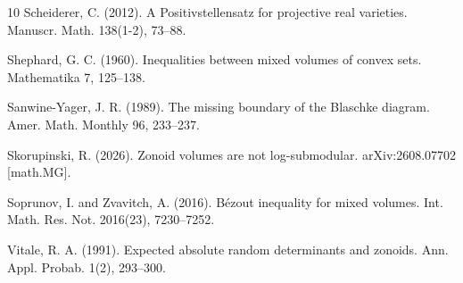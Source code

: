 \documentclass[11pt]{amsart}
\theoremstyle{definition}
\theoremstyle{remark}
\begin{document}
\begin{thebibliography}{10}
 Scheiderer, C. (2012). A Positivstellensatz for projective real varieties. Manuscr. Math. 138(1-2), 73–88.

 Shephard, G. C. (1960). Inequalities between mixed volumes of convex sets. Mathematika 7, 125–138.

 Sanwine-Yager, J. R. (1989). The missing boundary of the Blaschke diagram. Amer. Math. Monthly 96, 233–237.

 Skorupinski, R. (2026). Zonoid volumes are not log-submodular. arXiv:2608.07702 [math.MG].

 Soprunov, I. and Zvavitch, A. (2016). Bézout inequality for mixed volumes. Int. Math. Res. Not. 2016(23), 7230–7252.

 Vitale, R. A. (1991). Expected absolute random determinants and zonoids. Ann. Appl. Probab. 1(2), 293–300.


\end{thebibliography}
\end{document}

